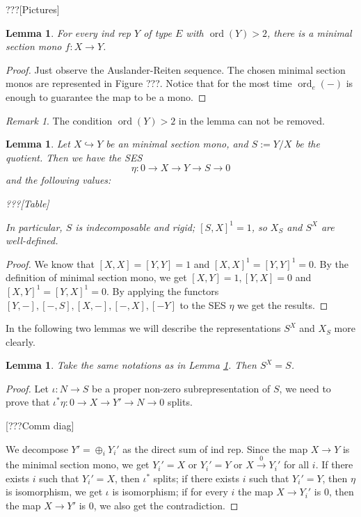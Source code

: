 \documentclass[reqno,11pt]{amsart}
\numberwithin{equation}{section}
\theoremstyle{plain}
\newtheorem{lemma}[theorem]{Lemma}
\theoremstyle{plain}
\numberwithin{equation}{section}
\theoremstyle{remark}
\newtheorem{remark}[theorem]{Remark}
\newcommand{\ord}{\operatorname{ord}}
\newcommand{\orde}{\operatorname{ord}_e }
\begin{document}
???[Pictures]

\begin{lemma}
	For every ind rep $Y$ of type $E$ with $\ord(Y)>2$, there is a minimal section mono $f:X \longrightarrow Y$.
\end{lemma}
\begin{proof}
	Just observe the Auslander-Reiten sequence. The chosen minimal section monos are represented in Figure ???. Notice that for the most time $\orde(-)$ is enough to guarantee the map to be a mono.
\end{proof}
\begin{remark}
	The condition $\ord(Y)>2$ in the lemma can not be removed.
\end{remark}
\begin{lemma}\label{lem:value}
Let $X \hookrightarrow Y$ be an minimal section mono, and $S:=Y/X$ be the quotient. Then we have the SES 
$$\eta: 0 \longrightarrow X \longrightarrow Y \longrightarrow S \longrightarrow 0$$
and the following values:

???[Table]

In particular, $S$ is indecomposable and rigid; $[S,X]^1 =1$, so $X_S$ and $S^X$ are well-defined.
\end{lemma}
\begin{proof}
We know that $[X,X]=[Y,Y]=1$ and $[X,X]^1=[Y,Y]^1=0$. By the definition of minimal section mono, we get
$[X,Y]=1, [Y,X]=0$ and $[X,Y]^1=[Y,X]^1=0$. By applying the functors $[Y,-],[-,S],[X,-],[-,X],[-Y]$ to the SES $\eta$ we get the results. 
\end{proof}
In the following two lemmas we will describe the representations $S^X$ and $X_S$ more clearly.
\begin{lemma} Take the same notations as in Lemma \ref{lem:value}. Then $S^X=S$.
\end{lemma}
\begin{proof}
	Let $\iota:N \longrightarrow S$ be a proper non-zero subrepresentation of $S$, we need to prove that $\iota^* \eta: 0\longrightarrow X \longrightarrow Y' \longrightarrow N \longrightarrow 0$ splits.
	
	[???Comm diag]
	
	We decompose $Y'=\oplus_i Y_i'$ as the direct sum of ind rep. Since the map $X\longrightarrow Y$ is the minimal section mono, we get $Y_i'=X$ or $Y_i'=Y$ or $X\stackrel{0}{\longrightarrow} Y_i'$ for all $i$.
	If there exists $i$ such that $Y_i'=X$, then $\iota^* $ splits; if there exists $i$ such that $Y_i'=Y$, then $\eta$ is isomorphism, we get $\iota$ is isomorphism; if for every $i$ the map $X \longrightarrow Y_i'$ is $0$, then the map $X \longrightarrow Y'$ is $0$, we also get the contradiction.
\end{proof}
\end{document}
